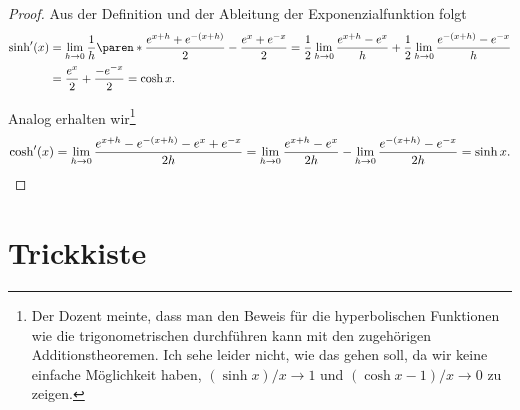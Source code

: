 \documentclass[a4paper]{article}
\begin{document}
\begin{proof}
    Aus der Definition und der Ableitung der Exponenzialfunktion folgt
    \begin{align*}
        \sinh'(x) &= \lim_{h\to0} \frac{1}{h} \paren*{\frac{e^{x+h}+e^{-(x+h)}}{2} - \frac{e^x+e^{-x}}{2}} = \frac{1}{2} \lim_{h\to0} \frac{e^{x+h}-e^x}{h} + \frac{1}{2} \lim_{h\to0} \frac{e^{-(x+h)}-e^{-x}}{h} \\
        &= \frac{e^x}{2} + \frac{-e^{-x}}{2} = \cosh x.
    \end{align*}

    Analog erhalten wir\footnote{Der Dozent meinte, dass man den Beweis für die hyperbolischen Funktionen wie die trigonometrischen durchführen kann mit den zugehörigen Additionstheoremen. Ich sehe leider nicht, wie das gehen soll, da wir keine einfache Möglichkeit haben, $(\sinh x)/x \to 1$ und $(\cosh x-1)/x \to 0$ zu zeigen.}
    \begin{equation*}
        \cosh'(x) =  \lim_{h\to0} \frac{e^{x+h} - e^{-(x+h)} - e^x + e^{-x}}{2h} = \lim_{h\to0} \frac{e^{x+h}-e^x}{2h} - \lim_{h\to0} \frac{e^{-(x+h)}-e^{-x}}{2h} = \sinh x. \qedhere
    \end{equation*}
\end{proof}


\newpage\appendix

\section{Trickkiste}
\end{document}
